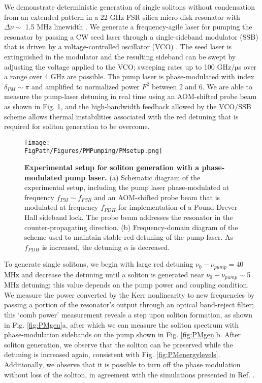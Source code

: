 We demonstrate deterministic generation of single solitons without condensation from an extended pattern in a 22-GHz FSR silica micro-disk resonator with $\Delta\nu\sim$ 1.5 MHz linewidth \cite{Lee2012}. We generate a frequency-agile laser for pumping the resonator by passing a CW seed laser through a single-sideband modulator (SSB) that is driven by a voltage-controlled oscillator (VCO) \cite{Stone2017}. The seed laser is extinguished in the modulator and the resulting sideband can be swept by adjusting the voltage applied to the VCO; sweeping rates up to 100 GHz/$\mathrm{\mu}$s over a range over 4 GHz are possible. The pump laser is phase-modulated with index $\delta_{PM}\sim\pi$ and amplified to normalized power $F^2$ between 2 and 6. We are able to measure the pump-laser detuning in real time using an AOM-shifted probe beam as shown in Fig. \ref{fig:PMsetup}, and the high-bandwidth feedback allowed by the VCO/SSB scheme allows thermal instabilities associated with the red detuning that is required for soliton generation to be overcome. 

\begin{figure}[htpb]
	\begin{center}
		\texttt{[image: \\FigPath/Figures/PMPumping/PMsetup.png]}
	\end{center}
	\caption[Experimental setup for soliton generation with a phase-modulated pump laser]{\textbf{Experimental setup for soliton generation with a phase-modulated pump laser.} (a) Schematic diagram of the experimental setup, including the pump laser phase-modulated at frequency $f_{PM}\sim f_{FSR}$ and an AOM-shifted probe beam that is modulated at frequency $f_{PDH}$ for implementation of a Pound-Drever-Hall sideband lock. The probe beam addresses the resonator in the counter-propagating direction. (b) Frequency-domain diagram of the scheme used to maintain stable red detuning of the pump laser. As $f_{PDH}$ is increased, the detuning $\alpha$ is decreased.}
	\label{fig:PMsetup}
\end{figure} 


To generate single solitons, we begin with large red detuning $\nu_0-\nu_{pump}=$40 MHz and decrease the detuning until a soliton is generated near $\nu_0-\nu_{pump}\sim$5 MHz detuning; this value depends on the pump power and coupling condition. We measure the power converted by the Kerr nonlinearity to new frequencies by passing a portion of the resonator's output through an optical band-reject filter; this `comb power' measurement reveals a step upon soliton formation, as shown in Fig. \ref{fig:PMgen}a, after which we can measure the soliton spectrum with phase-modulation sidebands on the pump shown in Fig. \ref{fig:PMgen}b. After soliton generation, we observe that the soliton can be preserved while the detuning is increased again, consistent with Fig. \ref{fig:PMenergylevels}. Additionally, we observe that it is possible to turn off the phase modulation without loss of the soliton, in agreement with the simulations presented in Ref. \cite{Taheri2015}.

